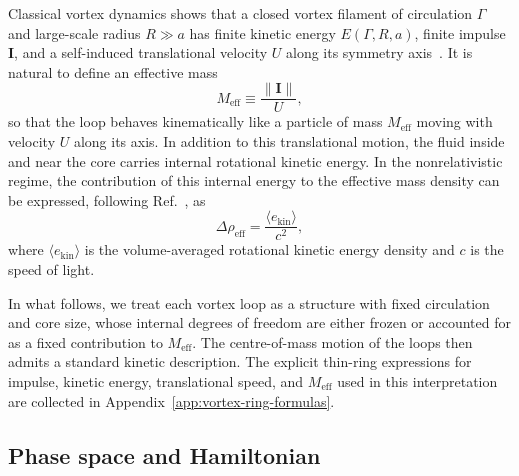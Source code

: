 \documentclass[11pt]{article}
\begin{document}
            Classical vortex dynamics shows that a closed vortex filament of circulation $\Gamma$
            and large-scale radius $R \gg a$ has finite kinetic energy $E(\Gamma,R,a)$, finite
            impulse $\boldsymbol{I}$, and a self-induced translational velocity $U$ along its symmetry
            axis~\cite{Batchelor1967,Saffman1992,Iskandarani2025_VortexLoops}. It is natural to define
            an effective mass
            \begin{equation}
                M_{\mathrm{eff}} \equiv \frac{\|\boldsymbol{I}\|}{U},
                \label{eq:Meff-def}
            \end{equation}
            so that the loop behaves kinematically like a particle of mass $M_{\mathrm{eff}}$ moving
            with velocity $U$ along its axis. In addition to this translational motion, the fluid
            inside and near the core carries internal rotational kinetic energy. In the nonrelativistic
            regime, the contribution of this internal energy to the effective mass density can be
            expressed, following Ref.~\cite{Iskandarani2025_RotKE}, as
            \begin{equation}
                \Delta \rho_{\mathrm{eff}} = \frac{\langle e_{\mathrm{kin}}\rangle}{c^2},
                \label{eq:Delta-rho-eff}
            \end{equation}
            where $\langle e_{\mathrm{kin}}\rangle$ is the volume-averaged rotational kinetic energy
            density and $c$ is the speed of light.

        In what follows, we treat each vortex loop as a structure with fixed circulation and
        core size, whose internal degrees of freedom are either frozen or accounted for as a
        fixed contribution to $M_{\mathrm{eff}}$. The centre-of-mass motion of the loops then
        admits a standard kinetic description. The explicit thin-ring expressions for impulse,
        kinetic energy, translational speed, and $M_{\mathrm{eff}}$ used in this interpretation
        are collected in Appendix~\ref{app:vortex-ring-formulas}.

        \subsection{Phase space and Hamiltonian}
\end{document}
